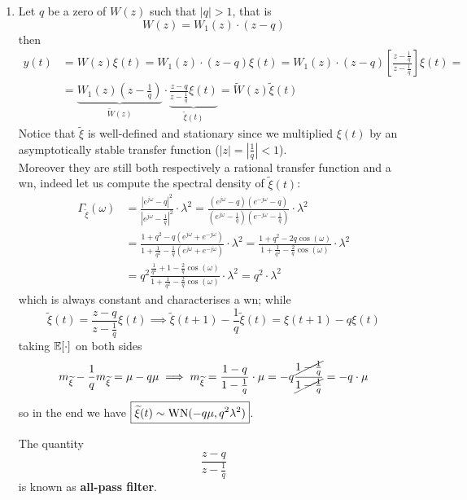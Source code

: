 \begin{enumerate}
	\item 
	Let $q$ be a zero of $W(z)$ such that $|q|>1$, that is
	\[
		W(z)=W_{1}(z)\cdot(z-q)
	\]
	then
	\begin{align*}
		y(t)&=W(z) \xi(t)=W_{1}(z) \cdot(z-q) \xi(t)=W_{1}(z) \cdot(z-q) \left[ \frac{z-\frac{1}{q}}{z-\frac{1}{q}}\right] \xi(t)= \\
		&=\underbrace{W_{1}(z)\left(z-\frac{1}{q}\right)}_{\tilde{W}(z)}\cdot\underbrace{\frac{z-q}{z-\frac{1}{q}} \xi(t)}_{\tilde{\xi}(t)} = \tilde{W}(z) \tilde{\xi}(t)
	\end{align*}
	Notice that $\tilde{\xi}$ is well-defined and stationary since we multiplied $\xi(t)$ by an asymptotically stable transfer function ($|z|=\left|\frac{1}{q}\right|<1$).\\
	Moreover they are still both respectively a rational transfer function and a \gls{wn}, indeed let us compute the spectral density of $\tilde{\xi}(t)$:
	\begin{align*}
		\Gamma_{\tilde\xi}(\omega) &=\frac{\left|e^{j \omega}-q\right|^{2}}{\left|e^{j \omega}-\frac{1}{q}\right|^{2}} \cdot \lambda^{2}=\frac{\left(e^{j \omega}-q\right)\left(e^{-j \omega}-q\right)}{\left(e^{j \omega}-\frac{1}{q}\right)\left(e^{-j \omega}-\frac{1}{q}\right)} \cdot \lambda^{2}\\
		&=\frac{1+q^{2}-q\left(e^{j \omega}+e^{-j \omega}\right)}{1+\frac{1}{q^{2}}-\frac{1}{q}\left(e^{j \omega}+e^{-j \omega}\right)} \cdot \lambda^{2}=\frac{1+q^{2}-2 q \cos (\omega)}{1+\frac{1}{q^{2}}-\frac{2}{q} \cos (\omega)} \cdot \lambda^{2}\\
		&=q^{2} \frac{\frac{1}{q^{2}}+1-\frac{2}{q} \cos (\omega)}{1+\frac{1}{q^{2}}-\frac{2}{q} \cos (\omega)} \cdot \lambda^{2}=q^{2} \cdot \lambda^{2}
	\end{align*}
	which is always constant and characterises a \gls{wn}; while
	\[
		\boxed{\tilde \xi(t) = \frac{z-q}{z-\frac{1}{q}} \xi(t)} \implies \tilde \xi(t+1)-\frac{1}{q}\tilde \xi(t)=\xi(t+1)-q\xi(t)
	\]
	taking $\E[\cdot]$ on both sides
	\[
		m_{\tilde\xi} - \frac{1}{q} m_{\tilde\xi} = \mu - q\mu \implies m_{\tilde\xi} = \frac{1-q}{1-\frac{1}{q}} \cdot \mu = -q \frac{\cancel{1-\frac{1}{q}}}{\cancel{1-\frac{1}{q}}}=  - q \cdot \mu
	\]
	so in the end we have $\boxed{\tilde\xi(t)\sim \WN(-q\mu,q^2 \lambda^2 )}$.

	The quantity
	\[
		\boxed{\frac{z-q}{z-\frac{1}{q}}}
	\]
	is known as \textbf{all-pass filter}.
\end{enumerate}